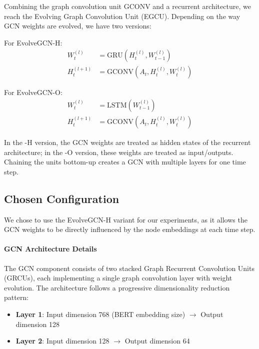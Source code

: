 Combining the graph convolution unit GCONV and a recurrent architecture, we reach the Evolving Graph Convolution Unit (EGCU). Depending on the way GCN weights are evolved, we have two versions:

For EvolveGCN-H:
\begin{align}
	W_t^{(l)}   & = \text{GRU}(H_t^{(l)}, W_{t-1}^{(l)})    \\
	H_t^{(l+1)} & = \text{GCONV}(A_t, H_t^{(l)}, W_t^{(l)})
\end{align}

For EvolveGCN-O:
\begin{align}
	W_t^{(l)}   & = \text{LSTM}(W_{t-1}^{(l)})              \\
	H_t^{(l+1)} & = \text{GCONV}(A_t, H_t^{(l)}, W_t^{(l)})
\end{align}

In the -H version, the GCN weights are treated as hidden states of the recurrent architecture; in the -O version, these weights are treated as input/outputs. Chaining the units bottom-up creates a GCN with multiple layers for one time step.

\subsection*{Chosen Configuration}
\label{sec:chosen_config}

We chose to use the EvolveGCN-H variant for our experiments, as it allows the GCN weights to be directly influenced by the node embeddings at each time step.

\paragraph{GCN Architecture Details}

The GCN component consists of two stacked Graph Recurrent Convolution Units (GRCUs), each implementing a single graph convolution layer with weight evolution. The architecture follows a progressive dimensionality reduction pattern:
\begin{itemize}
	\item \textbf{Layer 1}: Input dimension 768 (BERT embedding size) $\rightarrow$ Output dimension 128
	\item \textbf{Layer 2}: Input dimension 128 $\rightarrow$ Output dimension 64
\end{itemize}

